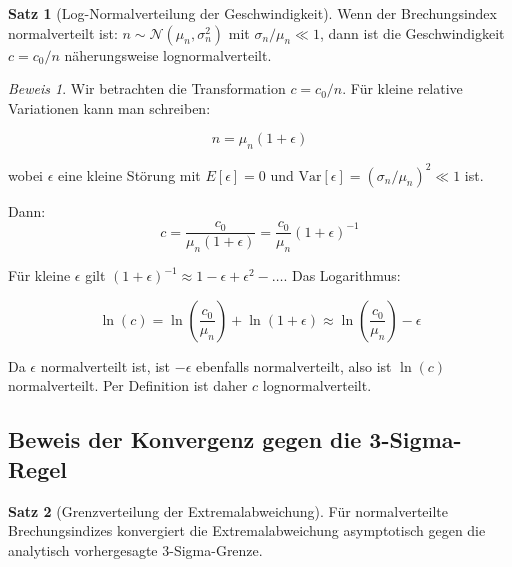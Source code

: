 \documentclass[a4paper,12pt]{article}
\theoremstyle{definition}
\newtheorem{satz}{Satz}[section]
\theoremstyle{remark}
\newtheorem*{beweis}{Beweis}
\newcommand{\cLight}{c}
\newcommand{\refIndex}{n}
\begin{document}
\begin{satz}[Log-Normalverteilung der Geschwindigkeit]
Wenn der Brechungsindex normalverteilt ist: $\refIndex \sim \mathcal{N}(\mu_n, \sigma_n^2)$ mit $\sigma_n / \mu_n \ll 1$, dann ist die Geschwindigkeit $\cLight = \cLight_0 / \refIndex$ näherungsweise lognormalverteilt.
\end{satz}

\begin{beweis}
Wir betrachten die Transformation $\cLight = \cLight_0 / \refIndex$. Für kleine relative Variationen kann man schreiben:

\begin{equation}
    \refIndex = \mu_n(1 + \epsilon)
\end{equation}

wobei $\epsilon$ eine kleine Störung mit $E[\epsilon] = 0$ und $\text{Var}[\epsilon] = (\sigma_n/\mu_n)^2 \ll 1$ ist.

Dann:
\begin{equation}
    \cLight = \frac{\cLight_0}{\mu_n(1+\epsilon)} = \frac{\cLight_0}{\mu_n}(1+\epsilon)^{-1}
\end{equation}

Für kleine $\epsilon$ gilt $(1+\epsilon)^{-1} \approx 1 - \epsilon + \epsilon^2 - \ldots$. Das Logarithmus:

\begin{equation}
    \ln(\cLight) = \ln\left(\frac{\cLight_0}{\mu_n}\right) + \ln(1+\epsilon) \approx \ln\left(\frac{\cLight_0}{\mu_n}\right) - \epsilon
\end{equation}

Da $\epsilon$ normalverteilt ist, ist $-\epsilon$ ebenfalls normalverteilt, also ist $\ln(\cLight)$ normalverteilt. Per Definition ist daher $\cLight$ lognormalverteilt.
\end{beweis}

\subsection{Beweis der Konvergenz gegen die 3-Sigma-Regel}

\begin{satz}[Grenzverteilung der Extremalabweichung]
Für normalverteilte Brechungsindizes konvergiert die Extremalabweichung asymptotisch gegen die analytisch vorhergesagte 3-Sigma-Grenze.
\end{satz}
\end{document}
